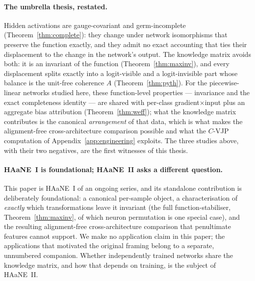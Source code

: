 \paragraph{The umbrella thesis, restated.}
Hidden activations are gauge-covariant and germ-incomplete
(Theorem~\ref{thm:complete}): they change under
network isomorphisms that preserve the function exactly, and they
admit no exact accounting that ties their displacement to the change
in the network's output. The knowledge matrix avoids both: it is an
invariant of the function (Theorem~\ref{thm:maxinv}), and every
displacement splits exactly into a logit-visible and a logit-invisible
part whose balance is the unit-free coherence $A$
(Theorem~\ref{thm:pyth}). For the piecewise-linear networks studied
here, these function-level properties --- invariance and the exact
completeness identity --- are shared with per-class gradient$\times$input
plus an aggregate bias attribution (Theorem~\ref{thm:weff}); what the
knowledge matrix contributes is the canonical \emph{arrangement} of that
data, which is what makes the alignment-free cross-architecture
comparison possible and what the $C$-VJP computation of
Appendix~\ref{app:engineering} exploits. The three studies above, with
their two negatives, are the first witnesses of this thesis.

\paragraph{HAaNE~I is foundational; HAaNE~II asks a different question.}
This paper is HAaNE~I of an ongoing series, and its standalone
contribution is deliberately foundational: a canonical per-sample object,
a characterisation of \emph{exactly} which transformations leave it
invariant (the full function-stabiliser, Theorem~\ref{thm:maxinv}, of
which neuron permutation is one special case), and the resulting
alignment-free cross-architecture comparison that penultimate features
cannot support. We make no application claim in this paper; the
applications that motivated the original framing belong to a separate,
unnumbered companion. Whether independently trained networks share the
knowledge matrix, and how that depends on training, is the subject of
HAaNE~II.

